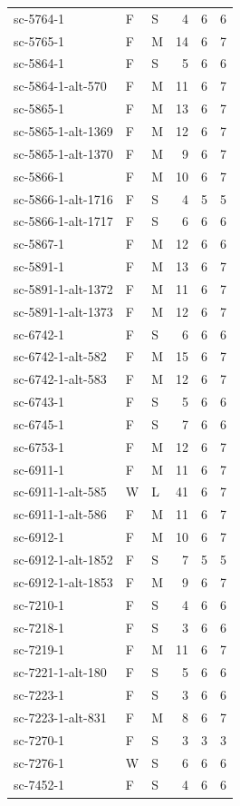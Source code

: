 \begin{longtable}{@{}p{}llrrr@{}}
sc-5764-1 & F & S & 4 & 6 & 6\\
sc-5765-1 & F & M & 14 & 6 & 7\\
sc-5864-1 & F & S & 5 & 6 & 6\\
sc-5864-1-alt-570 & F & M & 11 & 6 & 7\\
sc-5865-1 & F & M & 13 & 6 & 7\\
sc-5865-1-alt-1369 & F & M & 12 & 6 & 7\\
sc-5865-1-alt-1370 & F & M & 9 & 6 & 7\\
sc-5866-1 & F & M & 10 & 6 & 7\\
sc-5866-1-alt-1716 & F & S & 4 & 5 & 5\\
sc-5866-1-alt-1717 & F & S & 6 & 6 & 6\\
sc-5867-1 & F & M & 12 & 6 & 6\\
sc-5891-1 & F & M & 13 & 6 & 7\\
sc-5891-1-alt-1372 & F & M & 11 & 6 & 7\\
sc-5891-1-alt-1373 & F & M & 12 & 6 & 7\\
sc-6742-1 & F & S & 6 & 6 & 6\\
sc-6742-1-alt-582 & F & M & 15 & 6 & 7\\
sc-6742-1-alt-583 & F & M & 12 & 6 & 7\\
sc-6743-1 & F & S & 5 & 6 & 6\\
sc-6745-1 & F & S & 7 & 6 & 6\\
sc-6753-1 & F & M & 12 & 6 & 7\\
sc-6911-1 & F & M & 11 & 6 & 7\\
sc-6911-1-alt-585 & W & L & 41 & 6 & 7\\
sc-6911-1-alt-586 & F & M & 11 & 6 & 7\\
sc-6912-1 & F & M & 10 & 6 & 7\\
sc-6912-1-alt-1852 & F & S & 7 & 5 & 5\\
sc-6912-1-alt-1853 & F & M & 9 & 6 & 7\\
sc-7210-1 & F & S & 4 & 6 & 6\\
sc-7218-1 & F & S & 3 & 6 & 6\\
sc-7219-1 & F & M & 11 & 6 & 7\\
sc-7221-1-alt-180 & F & S & 5 & 6 & 6\\
sc-7223-1 & F & S & 3 & 6 & 6\\
sc-7223-1-alt-831 & F & M & 8 & 6 & 7\\
sc-7270-1 & F & S & 3 & 3 & 3\\
sc-7276-1 & W & S & 6 & 6 & 6\\
sc-7452-1 & F & S & 4 & 6 & 6\\

\end{longtable}

